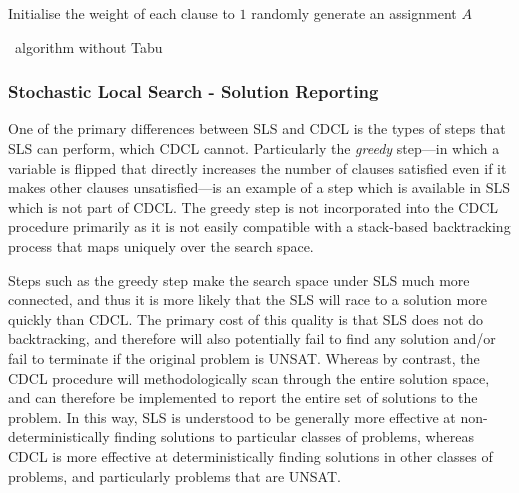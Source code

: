 \documentclass[
10pt, %
a4paper, %
oneside, %
headinclude,footinclude, %
BCOR5mm, %
]{scrartcl}
\begin{document}
\begin{algorithm}[H]
\SetAlgoLined
{}
Initialise the weight of each clause to $1$\;
randomly generate an assignment $A$\;
 \caption{\gnoveltyp\ algorithm without Tabu}\label{algorithm3}
\end{algorithm}



\subsubsection{Stochastic Local Search - Solution Reporting}
One of the primary differences between SLS and CDCL is the types of steps that SLS can perform, which CDCL cannot.
Particularly the \textit{greedy} step---in which a variable is flipped that directly increases the number of clauses satisfied even if it makes other clauses unsatisfied---is an example of a step which is available in SLS which is not part of CDCL.
The greedy step is not incorporated into the CDCL procedure primarily as it is not easily compatible with a stack-based backtracking process that maps uniquely over the search space.

Steps such as the greedy step make the search space under SLS much more connected, and thus it is more likely that the SLS will race to a solution more quickly than CDCL.
The primary cost of this quality is that SLS does not do backtracking, and therefore will also potentially fail to find any solution and/or fail to terminate if the original problem is UNSAT.
Whereas by contrast, the CDCL procedure will methodologically scan through the entire solution space, and can therefore be implemented to report the entire set of solutions to the problem.
In this way, SLS is understood to be generally more effective at non-deterministically finding solutions to particular classes of problems, whereas CDCL is more effective at deterministically finding solutions in other classes of problems, and particularly problems that are UNSAT.
\end{document}

